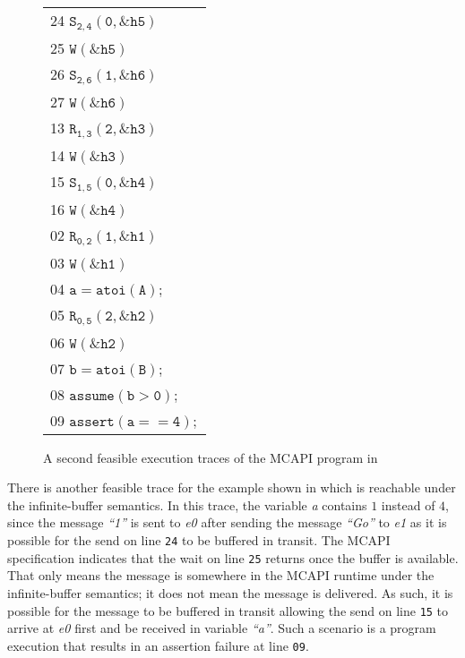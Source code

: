 \begin{figure}[h]
\begin{center}
\setlength{\tabcolsep}{2pt}
\scriptsize \begin{tabular}[t]{l}
24 $\mathtt{S_{2,4}(0,\&h5)}$ \\
25 $\mathtt{W(\&h5)}$ \\
26 $\mathtt{S_{2,6}(1,\&h6)}$ \\
27 $\mathtt{W(\&h6)}$ \\
\hline
13 $\mathtt{R_{1,3}(2,\&h3)}$ \\
14 $\mathtt{W(\&h3)}$ \\
15 $\mathtt{S_{1,5}(0,\&h4)}$ \\
16 $\mathtt{W(\&h4)}$ \\
\hline
02 $\mathtt{R_{0,2}(1,\&h1)}$ \\
03 $\mathtt{W(\&h1)}$ \\
04 $\mathtt{a = atoi(A);}$ \\
05 $\mathtt{R_{0,5}(2,\&h2)}$\\
06 $\mathtt{W(\&h2)}$ \\
07 $\mathtt{b = atoi(B);}$ \\
08 $\mathtt{assume (b > 0);}$ \\
09 $\mathtt{assert(a == 4);}$ \\
\hline
\end{tabular}
\end{center}
\caption{A second feasible  execution traces of the MCAPI program in }
\label{fig:trace2}
\end{figure}

There is another feasible trace for the example shown in
 which is reachable under the infinite-buffer
semantics. In this trace, the variable \textit{a} contains $1$ instead
of $4$, since the message \textit{``1''} is sent to \textit{e0} after
sending the message \textit{``Go''} to \textit{e1} as it is possible
for the send on line \texttt{24} to be buffered in transit. The MCAPI
specification indicates that the wait on line \texttt{25} returns once
the buffer is available. That only means the message is somewhere in
the MCAPI runtime under the infinite-buffer semantics; it does not
mean the message is delivered. As such, it is possible for the message
to be buffered in transit allowing the send on line \texttt{15}
to arrive at \textit{e0} first and be received in variable
\textit{``a''}. Such a scenario is a program execution that results in
an assertion failure at line \texttt{09}.

